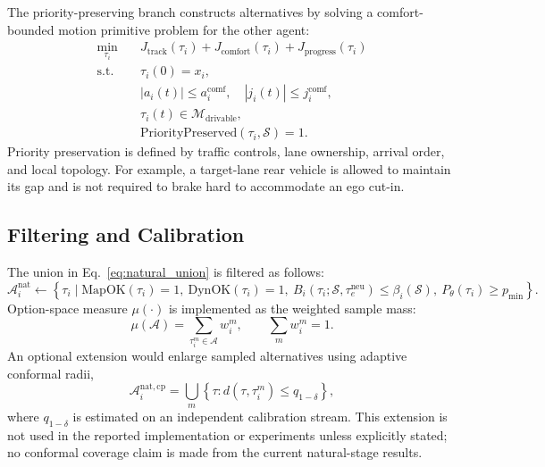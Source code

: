 \documentclass[10pt]{article}
\begin{document}
The priority-preserving branch constructs alternatives by solving a comfort-bounded motion primitive problem for the other agent:
\begin{equation}
\begin{aligned}
    \min_{\tau_i}\quad
    &
    J_{\mathrm{track}}(\tau_i)
    +
    J_{\mathrm{comfort}}(\tau_i)
    +
    J_{\mathrm{progress}}(\tau_i)\\
    \mathrm{s.t.}\quad
    &
    \tau_i(0)=x_i,\\
    &
    |a_i(t)|\le a^{\mathrm{comf}}_i,\quad
    |j_i(t)|\le j^{\mathrm{comf}}_i,\\
    &
    \tau_i(t)\in\mathcal{M}_{\mathrm{drivable}},\\
    &
    \mathrm{PriorityPreserved}(\tau_i,\mathcal{S})=1 .
\end{aligned}
\end{equation}
Priority preservation is defined by traffic controls, lane ownership, arrival order, and local topology. For example, a target-lane rear vehicle is allowed to maintain its gap and is not required to brake hard to accommodate an ego cut-in.

\subsection{Filtering and Calibration}
\label{app:natural_filtering}

The union in Eq.~\eqref{eq:natural_union} is filtered as follows:
\begin{equation}
    \mathcal{A}^{\mathrm{nat}}_i
    \leftarrow
    \left\{
    \tau_i
    \mid
    \mathrm{MapOK}(\tau_i)=1,\ 
    \mathrm{DynOK}(\tau_i)=1,\ 
    B_i(\tau_i;\mathcal{S},\tau^{\mathrm{neu}}_e)\le \beta_i(\mathcal{S}),\
    P_\theta(\tau_i)\ge p_{\min}
    \right\}.
\end{equation}
Option-space measure $\mu(\cdot)$ is implemented as the weighted sample mass:
\begin{equation}
    \mu(\mathcal{A})
    =
    \sum_{\tau_i^m\in\mathcal{A}} w_i^m,
    \qquad
    \sum_m w_i^m=1 .
\end{equation}
An optional extension would enlarge sampled alternatives using adaptive conformal radii,
\begin{equation}
    \mathcal{A}^{\mathrm{nat,cp}}_i
    =
    \bigcup_m
    \left\{
    \tau:
    d(\tau,\tau_i^m)\le q_{1-\delta}
    \right\},
\end{equation}
where $q_{1-\delta}$ is estimated on an independent calibration stream. This extension is not used in the reported implementation or experiments unless explicitly stated; no conformal coverage claim is made from the current natural-stage results.
\end{document}
